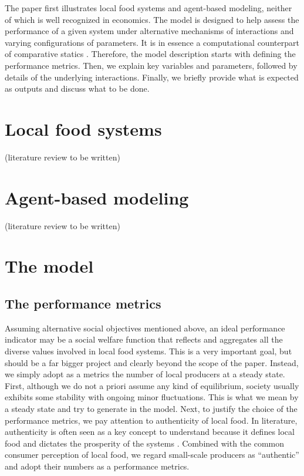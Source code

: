 \documentclass[11pt, oneside]{article}
\begin{document}
The paper first illustrates local food systems and agent-based modeling, neither of which is well recognized in economics. The model is designed to help assess the performance of a given system under alternative mechanisms of interactions and varying configurations of parameters. It is in essence a computational counterpart of comparative statics \parencite{Judd2006}. Therefore, the model description starts with defining the performance metrics. Then, we explain key variables and parameters, followed by details of the underlying interactions. Finally, we briefly provide what is expected as outputs and discuss what to be done.

\section{Local food systems}
(literature review to be written)


\section{Agent-based modeling}
(literature review to be written)


\section{The model}
\subsection{The performance metrics}
Assuming alternative social objectives mentioned above, an ideal performance indicator may be a social welfare function that reflects and aggregates all the diverse values involved in local food systems. This is a very important goal, but should be a far bigger project and clearly beyond the scope of the paper. Instead, we simply adopt as a metrics the number of local producers at a steady state. First, although we do not a priori assume any kind of equilibrium, society usually exhibits some stability with ongoing minor fluctuations. This is what we mean by a steady state and try to generate in the model. Next, to justify the choice of the performance metrics, we pay attention to authenticity of local food. In literature, authenticity is often seen as a key concept to understand because it defines local food and dictates the prosperity of the systems \parencite{Sims2009, Wittman2012}. Combined with the common consumer perception of local food, we regard small-scale producers as ``authentic'' and adopt their numbers as a performance metrics.
\end{document}
